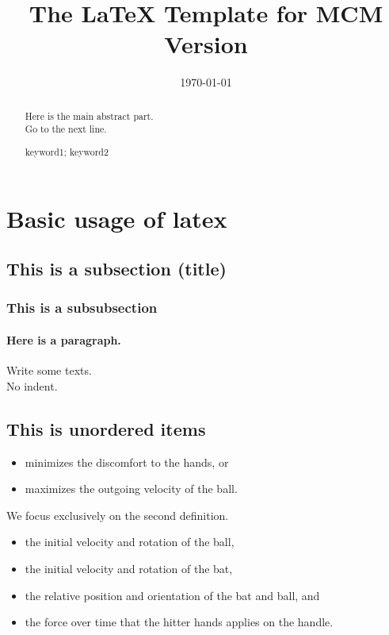\documentclass{mcmthesis}
\title{The \LaTeX{} Template for MCM Version \MCMversion}  %
\date{\today}
\begin{document}
	\begin{abstract}
		Here is the main abstract part. \\ Go to the next line.
		\begin{keywords}  
			keyword1; keyword2
		\end{keywords}
	\end{abstract}
	
	\maketitle         %
	\tableofcontents   %
	\newpage
	
	
	\section{Basic usage of latex}
	\subsection{This is a subsection (title)}
	\subsubsection{This is a subsubsection}
	\paragraph{Here is a paragraph.}Write some texts. \\ %
	No indent.
	
	\subsection{This is unordered items}
	\begin{itemize}
		\item minimizes the discomfort to the hands, or
		\item maximizes the outgoing velocity of the ball.
	\end{itemize}
	We focus exclusively on the second definition.
	\begin{itemize}
		\item the initial velocity and rotation of the ball,
		\item the initial velocity and rotation of the bat,
		\item the relative position and orientation of the bat and ball, and
		\item the force over time that the hitter hands applies on the handle.
	\end{itemize}
	
\end{document}
